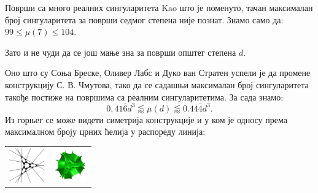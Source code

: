 \begin{surferPage}{Површи са много реалних сингуларитета}
    Kao што је поменуто, тачан максималан број сингуларитета за површи 
	седмог степена није познат.
    Знамо само да: $99\le \mu(7) \le 104$. 


    Зато и не чуди да се још мање зна за површи општег степена  $d$. 

    Оно што су Соња Бреске, Оливер Лабс и Дуко ван Стратен успели је да промене 
	конструкцију С. В. Чмутова, тако да се садашњи максималан број сингуларитета такође 
	постиже на површима са реалним сингуларитетима. 
    За сада знамо:
    \[0,41\bar{6}d^3 \lessapprox \mu(d) \lessapprox 0.44\bar{4} d^3.\]
     Из горњег се може видети симетрија конструкције и у ком је односу према максималном 
	 броју црних ћелија у распореду линија:
    \begin{center}
      \begin{tabular}{c@{\qquad}c}
        \includegraphics[height=1.5cm]{./../../common/images/vielesing.pdf}
        &
        \includegraphics[height=1.5cm]{./../../common/images/p9surface_von_oben}
      \end{tabular}
    \end{center}
\end{surferPage}
